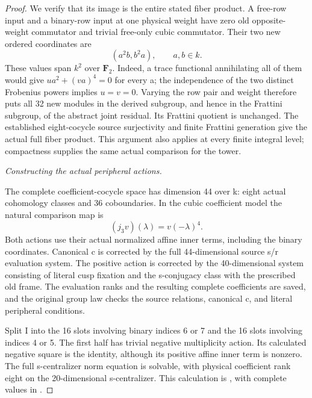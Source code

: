 \begin{proof}
We verify that its image is the entire stated fiber product. A free-row
input and a binary-row input at one physical weight have zero old
opposite-weight commutator and trivial free-only cubic commutator.
Their two new ordered coordinates are
\[
 (a^2b,b^2a),\qquad a,b\in k.
 \tag{A.72.4}
\]
These values span \(k^2\) over \(\mathbf F_2\). Indeed, a trace
functional annihilating all of them would give
\(u a^2+(v a)^4=0\) for every a; the independence of the two distinct
Frobenius powers implies \(u=v=0\). Varying the row pair and weight
therefore puts all 32 new modules in the derived subgroup, and hence
in the Frattini subgroup, of the abstract joint residual. Its Frattini
quotient is unchanged. The established eight-cocycle source
surjectivity and finite Frattini generation give the actual full
fiber product. This argument also applies at every finite integral
level; compactness supplies the same actual comparison for the tower.

\emph{Constructing the actual peripheral actions.}\par
The complete coefficient-cocycle space has dimension 44 over k:
eight actual cohomology classes and 36 coboundaries. In the cubic
coefficient model the natural comparison map is
\[
 (j_3v)(\lambda)=v(-\lambda)^4.
 \tag{A.72.5}
\]
Both actions use their actual normalized affine inner terms, including
the binary coordinates. Canonical c is corrected by the full
44-dimensional source s/r evaluation system. The positive action is
corrected by the 40-dimensional system consisting of literal cusp
fixation and the s-conjugacy class with the prescribed old frame.
The evaluation ranks and the resulting complete coefficients are
saved, and the original group law checks the source relations,
canonical c, and literal peripheral conditions.

Split I into the 16 slots involving binary indices 6 or 7 and the 16
slots involving indices 4 or 5. The first half has trivial negative
multiplicity action. Its calculated negative square is the identity,
although its positive affine inner term is nonzero. The full
s-centralizer norm equation is solvable, with physical coefficient
rank eight on the 20-dimensional s-centralizer. This calculation is
, with complete values in
.


\end{proof}
